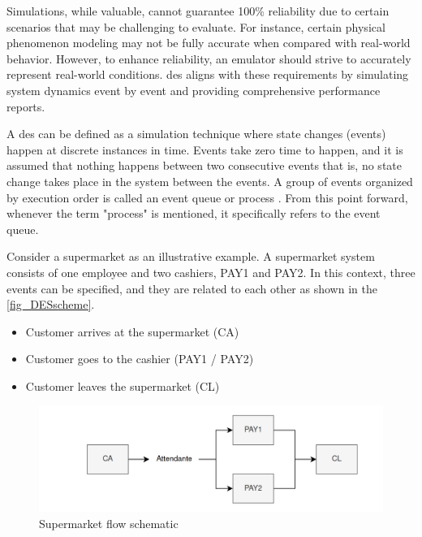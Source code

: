 
Simulations, while valuable, cannot guarantee 100\% reliability due to certain scenarios that may be challenging to evaluate. For instance, 
certain physical phenomenon modeling may not be fully accurate when compared with real-world behavior. However, to enhance reliability, an 
emulator should strive to accurately represent real-world conditions. \gls{des} aligns with these requirements by simulating system dynamics 
event by event and providing comprehensive performance reports.

A \gls{des} can be defined as a simulation technique where state changes (events) happen at discrete instances in time. Events take zero time 
to happen, and it is assumed that nothing happens between two consecutive events that is, no state change takes place in the system between the 
events. A group of events organized by execution order is called an event queue or process \cite{DESVarga} \cite{SimulationBook}. From this point 
forward, whenever the term "process" is mentioned, it specifically refers to the event queue.

Consider a supermarket as an illustrative example. A supermarket system consists of one employee and two cashiers, PAY1 and PAY2. In this context, 
three events can be specified, and they are related to each other as shown in the \autoref{fig_DESscheme}.

\begin{itemize}
    \item Customer arrives at the supermarket (CA)
    \item Customer goes to the cashier (PAY1 / PAY2)
    \item Customer leaves the supermarket (CL)
\end{itemize}

\begin{figure}[H]
	\centering
 	\includegraphics[width=0.9\linewidth]{Images/DES_Scheme.png}
 	\caption{Supermarket flow schematic}
	 \label{fig_DESscheme}
\end{figure}

